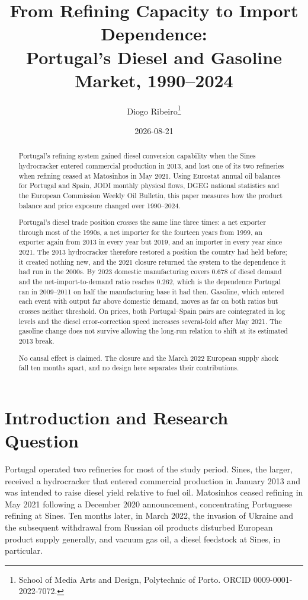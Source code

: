 \documentclass[11pt,a4paper]{article}
\title{From Refining Capacity to Import Dependence:\\
Portugal's Diesel and Gasoline Market, 1990--2024}
\author{Diogo Ribeiro\thanks{School of Media Arts and Design, Polytechnic of Porto.
ORCID 0009-0001-2022-7072.}}
\date{2026-08-21}
\begin{document}
\maketitle

\begin{abstract}
\noindent
Portugal's refining system gained diesel conversion capability when the Sines hydrocracker
entered commercial production in 2013, and lost one of its two refineries when refining ceased
at Matosinhos in May 2021. Using Eurostat annual oil balances for Portugal and Spain, JODI
monthly physical flows, DGEG national statistics and the European Commission Weekly Oil
Bulletin, this paper measures how the product balance and price exposure changed over
1990--2024.

Portugal's diesel trade position crosses the same line three times: a net exporter through most
of the 1990s, a net importer for the fourteen years from 1999, an exporter again from 2013 in
every year but 2019, and an importer in every year since 2021. The 2013 hydrocracker therefore
restored a position the country had held before; it created nothing new, and the 2021 closure
returned the system to the dependence it had run in the 2000s. By 2023 domestic manufacturing
covers $0.678$ of diesel demand and the net-import-to-demand ratio reaches $0.262$, which is the
dependence Portugal ran in 2009--2011 on half the manufacturing base it had then. Gasoline,
which entered each event with output far above domestic demand, moves as far on both ratios but
crosses neither threshold. On prices, both Portugal--Spain pairs are cointegrated in log levels
and the diesel error-correction speed increases several-fold after May 2021. The gasoline
change does not survive allowing the long-run relation to shift at its estimated 2013 break.

No causal effect is claimed. The closure and the March 2022 European supply shock fall ten
months apart, and no design here separates their contributions.
\end{abstract}

\section{Introduction and Research Question}
\label{sec:intro}

Portugal operated two refineries for most of the study period. Sines, the larger, received a
hydrocracker that entered commercial production in January 2013 and was intended to raise diesel
yield relative to fuel oil. Matosinhos ceased refining in May 2021 following a December 2020
announcement, concentrating Portuguese refining at Sines. Ten months later, in March 2022,
the invasion of Ukraine and the subsequent withdrawal from Russian oil products disturbed
European product supply generally, and vacuum gas oil, a diesel feedstock at Sines, in
particular.
\end{document}

